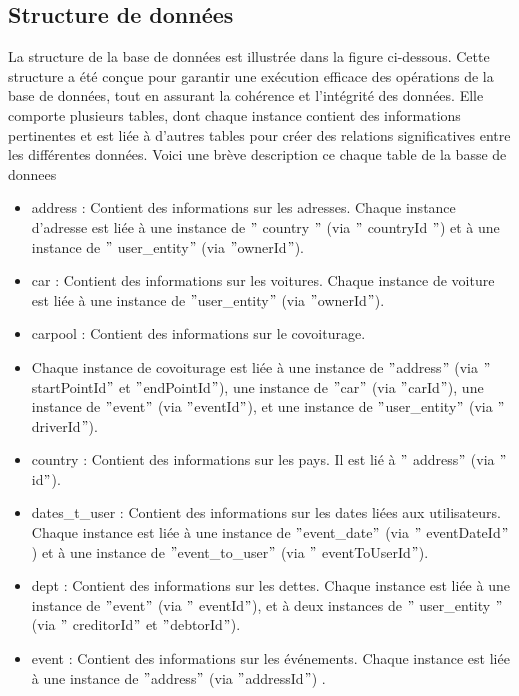 \subsection{Structure de données}\label{subsec:structure-de-donnees}
La structure de la base de données est illustrée dans la figure ci-dessous.
Cette structure a été conçue pour garantir une exécution efficace des opérations de la base de données, tout en assurant la cohérence et l'intégrité des données.
Elle comporte plusieurs tables, dont chaque instance contient des informations pertinentes et est liée à d'autres tables pour créer des relations significatives entre les différentes données.
Voici une brève description ce chaque table de la basse de donnees
\begin{itemize}
    \item address : Contient des informations sur les adresses.
    Chaque instance d'adresse est liée à une instance de \("\) country \("\) (via \("\) countryId \("\)) et à une instance de \("\) user\_entity\("\) (via \("\)ownerId\("\)).
    \item car : Contient des informations sur les voitures.
    Chaque instance de voiture est liée à une instance de \("\)user\_entity\("\) (via \("\)ownerId\("\)).
    \item carpool : Contient des informations sur le covoiturage.
    \item Chaque instance de covoiturage est liée à une instance de \("\)address\("\) (via \("\)startPointId\("\) et \("\)endPointId\("\)), une instance de \("\)car\("\) (via \("\)carId\("\)),
    une instance de \("\)event\("\) (via \("\)eventId\("\)), et une instance de \("\)user\_entity\("\) (via \("\)driverId\("\)).
    \item country : Contient des informations sur les pays.
    Il est lié à \("\) address\("\) (via \("\)id\("\)).
    \item  dates\_t\_user : Contient des informations sur les dates liées aux utilisateurs.
    Chaque instance est liée à une instance de \("\)event\_date\("\) (via \("\) eventDateId\("\)) et à une instance de \("\)event\_to\_user\("\) (via \("\) eventToUserId\("\)).
    \item dept : Contient des informations sur les dettes.
    Chaque instance est liée à une instance de \("\)event\("\) (via \("\) eventId\("\)), et à deux instances de \("\) user\_entity \("\) (via \("\) creditorId\("\) et \("\)debtorId\("\)).
    \item event : Contient des informations sur les événements.
    Chaque instance est liée à une instance de \("\)address\("\) (via \("\)addressId\("\)) .

\end{itemize}

